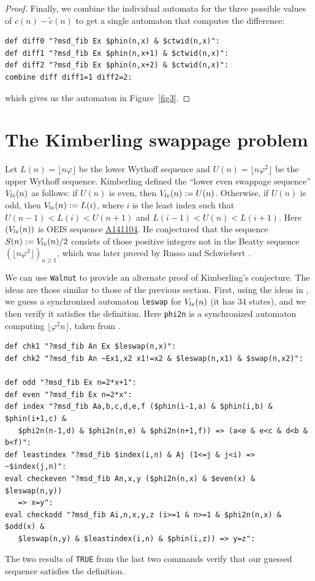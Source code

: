 \documentclass[12pt,reqno]{article}
\newcommand{\seqnum}[1]{\href{https://oeis.org/#1}{\rm \underline{#1}}}
\begin{document}
\begin{proof}
Finally, we combine the individual automata for the three
possible values of $c(n) - \tilde{c}(n)$ to get a single
automaton that computes the difference:
\begin{verbatim}
def diff0 "?msd_fib Ex $phin(n,x) & $ctwid(n,x)":
def diff1 "?msd_fib Ex $phin(n,x+1) & $ctwid(n,x)":
def diff2 "?msd_fib Ex $phin(n,x+2) & $ctwid(n,x)":
combine diff diff1=1 diff2=2:
\end{verbatim}
which gives us the automaton in Figure~\ref{fig3}. 
\end{proof}

\section{The Kimberling swappage problem}
\label{kimberling}


Let $L(n) = \lfloor n \varphi \rfloor$ be the lower
Wythoff sequence and $U(n) = \lfloor n \varphi^2 \rfloor$
be the upper Wythoff sequence.   Kimberling defined
the ``lower even swappage sequence'' $V_{\rm le}(n)$ as follows:  if $U(n)$ is 
even, then $V_{\rm le}(n) := U(n)$.   Otherwise, if $U(n)$ is odd,
then $V_{\rm le}(n) := L(i)$, where $i$ is the least index such that
$U(n-1) < L(i) < U(n+1)$ and
$L(i-1) < U(n) < L(i+1)$.  Here $(V_{\rm le}(n))$ is OEIS sequence
\seqnum{A141104}.  He conjectured
that the sequence $S(n):= V_{\rm le}(n)/2$ consists of those
positive integers not in the Beatty sequence
$(\lfloor n \varphi^3 \rfloor)_{n \geq 1}$, which was
later proved by Russo
and Schwiebert \cite{Russo&Schwiebert:2011}.

We can use {\tt Walnut} to provide an alternate proof
of Kimberling's conjecture.   The ideas are those similar to those of the previous section.   First, using the ideas
in \cite[\S 10.15]{Shallit:2023}, we guess a synchronized automaton {\tt leswap} for $V_{\rm le}(n)$ (it has $34$ states), and we then
verify it satisfies the definition.  Here {\tt phi2n} is a synchronized
automaton computing $\lfloor \varphi^2 n \rfloor$, taken from 
\cite[\S 10.11]{Shallit:2023}.
\begin{verbatim}
def chk1 "?msd_fib An Ex $leswap(n,x)":
def chk2 "?msd_fib An ~Ex1,x2 x1!=x2 & $leswap(n,x1) & $swap(n,x2)":

def odd "?msd_fib Ex n=2*x+1":
def even "?msd_fib Ex n=2*x":
def index "?msd_fib Aa,b,c,d,e,f ($phin(i-1,a) & $phin(i,b) & $phin(i+1,c) & 
   $phi2n(n-1,d) & $phi2n(n,e) & $phi2n(n+1,f)) => (a<e & e<c & d<b & b<f)":
def leastindex "?msd_fib $index(i,n) & Aj (1<=j & j<i) => ~$index(j,n)":
eval checkeven "?msd_fib An,x,y ($phi2n(n,x) & $even(x) & $leswap(n,y)) 
   => x=y":
eval checkodd "?msd_fib Ai,n,x,y,z (i>=1 & n>=1 & $phi2n(n,x) & $odd(x) & 
   $leswap(n,y) & $leastindex(i,n) & $phin(i,z)) => y=z":
\end{verbatim}
The two results of {\tt TRUE} from the last two commands verify that our guessed sequence
satisfies the definition.
\end{document}
